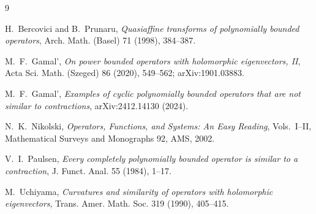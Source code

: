 \documentclass[11pt]{article}
\begin{document}
\begin{thebibliography}{9}

H.~Bercovici and B.~Prunaru,
\emph{Quasiaffine transforms of polynomially bounded operators},
Arch. Math. (Basel) 71 (1998), 384--387.

M.~F.~Gamal',
\emph{On power bounded operators with holomorphic eigenvectors, II},
Acta Sci. Math. (Szeged) 86 (2020), 549--562;
arXiv:1901.03883.

M.~F.~Gamal',
\emph{Examples of cyclic polynomially bounded operators that are not
similar to contractions}, arXiv:2412.14130 (2024).

N.~K.~Nikolski,
\emph{Operators, Functions, and Systems: An Easy Reading}, Vols.~I--II,
Mathematical Surveys and Monographs 92, AMS, 2002.

V.~I.~Paulsen,
\emph{Every completely polynomially bounded operator is similar to a
contraction}, J. Funct. Anal. 55 (1984), 1--17.

M.~Uchiyama,
\emph{Curvatures and similarity of operators with holomorphic eigenvectors},
Trans. Amer. Math. Soc. 319 (1990), 405--415.

\end{thebibliography}
\end{document}
